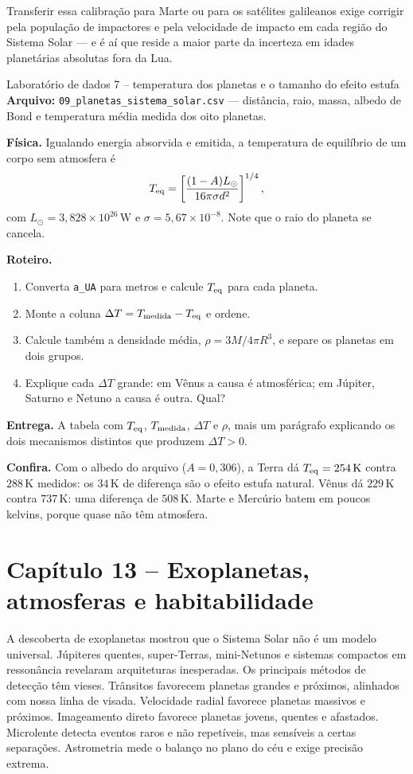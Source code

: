 \documentclass[11pt,a4paper]{article}
\begin{document}
Transferir essa calibração para Marte ou para os satélites galileanos exige corrigir pela população de impactores e pela velocidade de impacto em cada região do Sistema Solar --- e é aí que reside a maior parte da incerteza em idades planetárias absolutas fora da Lua.

\begin{lessonblock}[borderline west={2pt}{0pt}{astroGold}]{Laboratório de dados 7 -- temperatura dos planetas e o tamanho do efeito estufa}
\textbf{Arquivo:} \texttt{09\_planetas\_sistema\_solar.csv} --- distância, raio, massa, albedo de Bond e temperatura média medida dos oito planetas.

\textbf{Física.} Igualando energia absorvida e emitida, a temperatura de equilíbrio de um corpo sem atmosfera é
\[
T_{\rm eq}=\left[\frac{(1-A)L_\odot}{16\pi\sigma d^{2}}\right]^{1/4},
\]
com $L_\odot=3{,}828\times10^{26}\,\mathrm{W}$ e $\sigma=5{,}67\times10^{-8}$. Note que o raio do planeta se cancela.

\textbf{Roteiro.}
\begin{enumerate}
\item Converta \texttt{a\_UA} para metros e calcule $T_{\rm eq}$ para cada planeta.
\item Monte a coluna $\Delta T=T_{\rm medida}-T_{\rm eq}$ e ordene.
\item Calcule também a densidade média, $\rho=3M/4\pi R^{3}$, e separe os planetas em dois grupos.
\item Explique cada $\Delta T$ grande: em Vênus a causa é atmosférica; em Júpiter, Saturno e Netuno a causa é outra. Qual?
\end{enumerate}

\textbf{Entrega.} A tabela com $T_{\rm eq}$, $T_{\rm medida}$, $\Delta T$ e $\rho$, mais um parágrafo explicando os dois mecanismos distintos que produzem $\Delta T>0$.

\textbf{Confira.} Com o albedo do arquivo ($A=0{,}306$), a Terra dá $T_{\rm eq}=254\,\mathrm{K}$ contra $288\,\mathrm{K}$ medidos: os $34\,\mathrm{K}$ de diferença são o efeito estufa natural. Vênus dá $229\,\mathrm{K}$ contra $737\,\mathrm{K}$: uma diferença de $508\,\mathrm{K}$. Marte e Mercúrio batem em poucos kelvins, porque quase não têm atmosfera.
\end{lessonblock}

\newpage
\section*{Capítulo 13 -- Exoplanetas, atmosferas e habitabilidade}
A descoberta de exoplanetas mostrou que o Sistema Solar não é um modelo universal. Júpiteres quentes, super-Terras, mini-Netunos e sistemas compactos em ressonância revelaram arquiteturas inesperadas. Os principais métodos de detecção têm vieses. Trânsitos favorecem planetas grandes e próximos, alinhados com nossa linha de visada. Velocidade radial favorece planetas massivos e próximos. Imageamento direto favorece planetas jovens, quentes e afastados. Microlente detecta eventos raros e não repetíveis, mas sensíveis a certas separações. Astrometria mede o balanço no plano do céu e exige precisão extrema.
\end{document}
